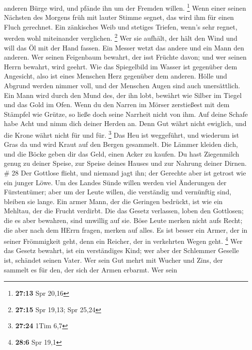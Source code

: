 anderen Bürge wird, und pfände ihn um der Fremden willen. \footnote{\textbf{27:13}
  Spr 20,16}  Wenn einer seinen Nächsten des Morgens früh
mit lauter Stimme segnet, das wird ihm für einen Fluch gerechnet.
 Ein zänkisches Weib und stetiges Triefen, wenn's sehr
regnet, werden wohl miteinander verglichen. \footnote{\textbf{27:15} Spr
  19,13; Spr 25,24}  Wer sie aufhält, der hält den Wind und
will das Öl mit der Hand fassen.  Ein Messer wetzt das
andere und ein Mann den anderen.  Wer seinen Feigenbaum
bewahrt, der isst Früchte davon; und wer seinen Herrn bewahrt, wird
geehrt.  Wie das Spiegelbild im Wasser ist gegenüber dem
Angesicht, also ist eines Menschen Herz gegenüber dem anderen.
 Hölle und Abgrund werden nimmer voll, und der Menschen
Augen sind auch unersättlich.  Ein Mann wird durch den Mund
des, der ihn lobt, bewährt wie Silber im Tiegel und das Gold im Ofen.
 Wenn du den Narren im Mörser zerstießest mit dem Stämpfel
wie Grütze, so ließe doch seine Narrheit nicht von ihm. 
Auf deine Schafe habe Acht und nimm dich deiner Herden an. 
Denn Gut währt nicht ewiglich, und die Krone währt nicht für und für.
\footnote{\textbf{27:24} 1Tim 6,7}  Das Heu ist weggeführt,
und wiederum ist Gras da und wird Kraut auf den Bergen gesammelt.
 Die Lämmer kleiden dich, und die Böcke geben dir das Geld,
einen Acker zu kaufen.  Du hast Ziegenmilch genug zu deiner
Speise, zur Speise deines Hauses und zur Nahrung deiner Dirnen. \# 28
 Der Gottlose flieht, und niemand jagt ihn; der Gerechte
aber ist getrost wie ein junger Löwe.  Um des Landes Sünde
willen werden viel Änderungen der Fürstentümer; aber um der Leute
willen, die verständig und vernünftig sind, bleiben sie lange.
 Ein armer Mann, der die Geringen bedrückt, ist wie ein
Mehltau, der die Frucht verdirbt.  Die das Gesetz verlassen,
loben den Gottlosen; die es aber bewahren, sind unwillig auf sie.
 Böse Leute merken nicht aufs Recht; die aber nach dem HErrn
fragen, merken auf alles.  Es ist besser ein Armer, der in
seiner Frömmigkeit geht, denn ein Reicher, der in verkehrten Wegen geht.
\footnote{\textbf{28:6} Spr 19,1}  Wer das Gesetz bewahrt,
ist ein verständiges Kind; wer aber der Schlemmer Geselle ist, schändet
seinen Vater.  Wer sein Gut mehrt mit Wucher und Zins, der
sammelt es für den, der sich der Armen erbarmt.  Wer sein
